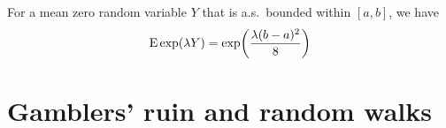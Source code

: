 \begin{namedthm}
    For a mean zero random variable $Y$ that is a.s.\ bounded within $[a,b]$, we have \[
        \mathop{}\!\mathrm{E}\exp(\lambda Y) = \exp\biggl(\frac{\lambda(b - a)^2}{8}\biggr)
    \]
\end{namedthm}

\begin{namedthm}
    
\end{namedthm}

\section{Gamblers' ruin and random walks}